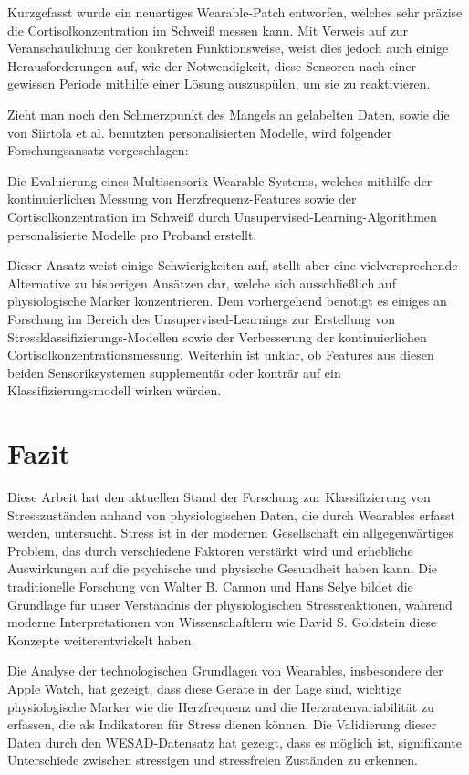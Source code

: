 Kurzgefasst wurde ein neuartiges Wearable-Patch entworfen, welches sehr präzise die Cortisolkonzentration im Schweiß messen kann. Mit Verweis auf \cite{Singh2023} zur Veranschaulichung der konkreten Funktionsweise, weist dies jedoch auch einige Herausforderungen auf, wie der Notwendigkeit, diese Sensoren nach einer gewissen Periode mithilfe einer Lösung auszuspülen, um sie zu reaktivieren.

Zieht man noch den Schmerzpunkt des Mangels an gelabelten Daten, sowie die von Siirtola et al. benutzten personalisierten Modelle, wird folgender Forschungsansatz vorgeschlagen:

Die Evaluierung eines Multisensorik-Wearable-Systems, welches mithilfe der kontinuierlichen Messung von Herzfrequenz-Features sowie der Cortisolkonzentration im Schweiß durch Unsupervised-Learning-Algorithmen personalisierte Modelle pro Proband erstellt.

Dieser Ansatz weist einige Schwierigkeiten auf, stellt aber eine vielversprechende Alternative zu bisherigen Ansätzen dar, welche sich ausschließlich auf physiologische Marker konzentrieren. Dem vorhergehend benötigt es einiges an Forschung im Bereich des Unsupervised-Learnings zur Erstellung von Stressklassifizierungs-Modellen sowie der Verbesserung der kontinuierlichen Cortisolkonzentrationsmessung. Weiterhin ist unklar, ob Features aus diesen beiden Sensoriksystemen supplementär oder konträr auf ein Klassifizierungsmodell wirken würden.

\section{Fazit}

Diese Arbeit hat den aktuellen Stand der Forschung zur Klassifizierung von Stresszuständen anhand von physiologischen Daten, die durch Wearables erfasst werden, untersucht. Stress ist in der modernen Gesellschaft ein allgegenwärtiges Problem, das durch verschiedene Faktoren verstärkt wird und erhebliche Auswirkungen auf die psychische und physische Gesundheit haben kann. Die traditionelle Forschung von Walter B. Cannon und Hans Selye bildet die Grundlage für unser Verständnis der physiologischen Stressreaktionen, während moderne Interpretationen von Wissenschaftlern wie David S. Goldstein diese Konzepte weiterentwickelt haben.

Die Analyse der technologischen Grundlagen von Wearables, insbesondere der Apple Watch, hat gezeigt, dass diese Geräte in der Lage sind, wichtige physiologische Marker wie die Herzfrequenz und die Herzratenvariabilität zu erfassen, die als Indikatoren für Stress dienen können. Die Validierung dieser Daten durch den WESAD-Datensatz hat gezeigt, dass es möglich ist, signifikante Unterschiede zwischen stressigen und stressfreien Zuständen zu erkennen.

